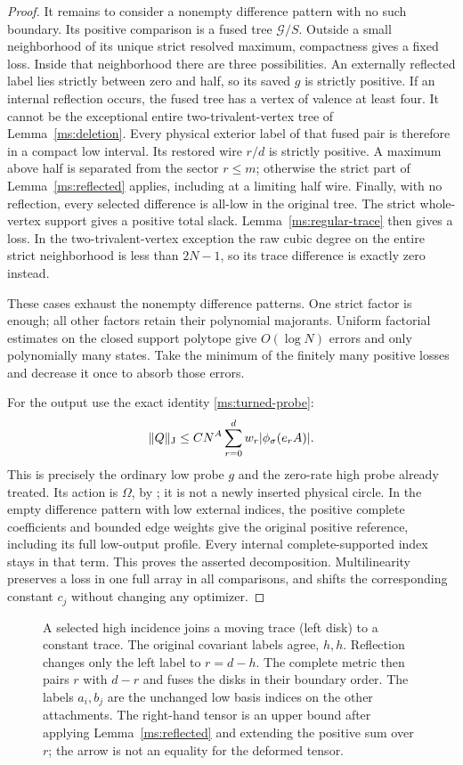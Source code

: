 \begin{proof}
It remains to consider a nonempty difference pattern with no such
boundary. Its positive comparison is a fused tree $\mathcal G/S$.
Outside a small neighborhood of its unique strict resolved maximum,
compactness gives a fixed loss. Inside that neighborhood there are
three possibilities. An externally reflected label lies strictly
between zero and half, so its saved $g$ is strictly positive. If
an internal reflection occurs, the fused tree has a vertex of
valence at least four. It cannot be the exceptional entire
two-trivalent-vertex tree of Lemma~\ref{ms:deletion}. Every physical
exterior label of that fused pair is therefore in a compact low
interval. Its restored wire $r/d$ is strictly positive. A maximum
above half is separated from the sector $r\le m$; otherwise the
strict part of Lemma~\ref{ms:reflected} applies, including at a
limiting half wire. Finally, with no reflection, every selected
difference is all-low in the original tree. The strict whole-vertex
support gives a positive total slack. Lemma~\ref{ms:regular-trace}
then gives a loss. In the two-trivalent-vertex exception the raw
cubic degree on the entire strict neighborhood is less than
$2N-1$, so its trace difference is exactly zero instead.

These cases exhaust the nonempty difference patterns. One strict
factor is enough; all other factors retain their polynomial
majorants. Uniform factorial estimates on the closed support
polytope give $O(\log N)$ errors and only polynomially many states.
Take the minimum of the finitely many positive losses and decrease
it once to absorb those errors.

For the output use the exact identity \eqref{ms:turned-probe}:
\[
 \lVert Q\rVert_{\mathrm J}\le C N^A\sum_{r=0}^d
                     w_r|\phi_\sigma(e_r A)|.
\]
This is precisely the ordinary low probe $g$ and the zero-rate high
probe already treated. Its action is $\Omega$, by
\cite[Theorems 7.3--7.4]{Newton}; it is not a newly inserted
physical circle. In the empty difference pattern with low external
indices, the positive complete coefficients and bounded edge
weights give the original positive reference, including its full
low-output profile. Every internal complete-supported index stays
in that term. This proves the asserted decomposition. Multilinearity
preserves a loss in one full array in all comparisons, and shifts
the corresponding constant $c_j$ without changing any optimizer.
\end{proof}

\begin{figure}[t]
\centering

\caption{A selected high incidence joins a moving trace (left disk)
to a constant trace. The original covariant labels agree, $h,h$.
Reflection changes only the left label to $r=d-h$. The complete
metric then pairs $r$ with $d-r$ and fuses the disks in their
boundary order. The labels $a_i,b_j$ are the unchanged low basis
indices on the other attachments. The right-hand tensor is an upper
bound after applying Lemma~\ref{ms:reflected} and extending the positive
sum over $r$; the arrow is not an equality for the deformed tensor.}
\label{ms:reflection-figure}
\end{figure}

